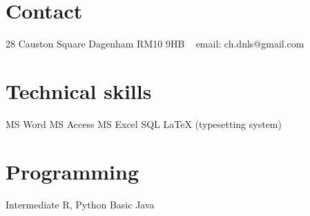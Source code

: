 \documentclass[print, oneside]{friggeri-cv} %
\begin{document}

\begin{aside} %
\section{Contact}
28 Causton Square
Dagenham
RM10 9HB
~
email: ch.dnls@gmail.com
\section{Technical skills}
MS Word
MS Access
MS Excel
SQL
LaTeX (typesetting system)
\section{Programming}
Intermediate
R, Python
Basic
Java
\end{aside}

\end{document}
